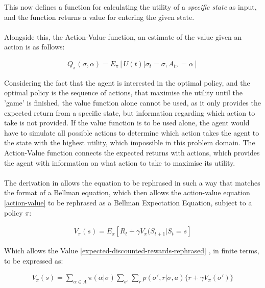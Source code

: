 \documentclass[ %
                    author={Ashwinder Khurana},
                supervisor={Prof Dave Cliff},
                    degree={MEng},
                     title={The Deeply Reinforced Trader},
                  subtitle={},
                      type={enterprise},
                      year={2020} ]{dissertation}
\begin{document}
{\noindent 
This now defines a function for calculating the utility of a \textit{specific state} as input, and the function returns a value for entering the given state.
\\
\\
Alongside this, the Action-Value function, an estimate of the value given an action is as follows:


\begin{equation}
\label{action-value}
\begin{split}
Q_\pi(\sigma , \alpha) = E_\pi [U(t) | \sigma_t = \sigma, A_t, = \alpha]
\end{split}
\end{equation}


\noindent 
Considering the fact that the agent is interested in the optimal policy, and the optimal policy is the sequence of actions, that maximise the utility until the 'game' is finished, the value function alone cannot be used, as it only provides the expected return from a specific state, but information regarding which action to take is not provided. If the value function is to be used alone, the agent would have to simulate all possible actions to determine which action takes the agent to the state with the highest utility, which impossible in this problem domain. The Action-Value function connects the expected returns with actions, which provides the agent with information on what action to take to maximise its utility. 
\\
\\
The derivation in \cite{rearrange-value-function https://www.jeremyjordan.me/markov-decision-process} allows the equation to be rephrased in such a way that matches the format of a Bellman equation, which then allows the action-value equation \ref{action-value} to be rephrased as a Bellman Expectation Equation, subject to a policy $\pi$:

\begin{equation}
\label{bellman}
\begin{split}
V_\pi(s) = E_\pi[R_t + \gamma V_\pi(S_{t+1} | S_t = s]
\end{split}
\end{equation}

\noindent
Which allows the Value \ref{expected-discounted-rewards-rephrased} , in finite terms, to be expressed as:

\begin{equation}
\label{value-function-bellman}
\begin{split}
V_\pi(s) = \sum\limits^{}_{\alpha \in A}{\pi(\alpha | \sigma)} \sum\limits^{}_{\sigma'}{\sum\limits^{}_{r}{p(\sigma' , r | \sigma, a) \{r + \gamma V_\pi(\sigma')\}}}
\end{split}
\end{equation}

}
\end{document}
